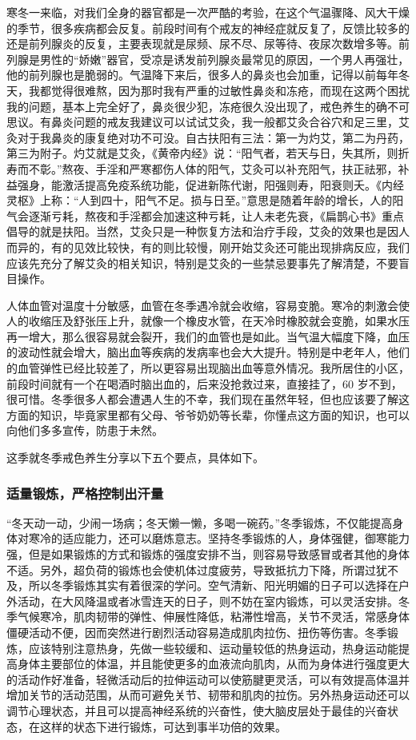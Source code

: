 寒冬一来临，对我们全身的器官都是一次严酷的考验，在这个气温骤降、风大干燥的季节，很多疾病都会反复。前段时间有个戒友的神经症就反复了，反馈比较多的还是前列腺炎的反复，主要表现就是尿频、尿不尽、尿等待、夜尿次数增多等。前列腺是男性的“娇嫩”器官，受凉是诱发前列腺炎最常见的原因，一个男人再强壮，他的前列腺也是脆弱的。气温降下来后，很多人的鼻炎也会加重，记得以前每年冬天，我都觉得很难熬，因为那时我有严重的过敏性鼻炎和冻疮，而现在这两个困扰我的问题，基本上完全好了，鼻炎很少犯，冻疮很久没出现了，戒色养生的确不可思议。有鼻炎问题的戒友我建议可以试试艾灸，我一般都艾灸合谷穴和足三里，艾灸对于我鼻炎的康复绝对功不可没。自古扶阳有三法：第一为灼艾，第二为丹药，第三为附子。灼艾就是艾灸，《黄帝内经》说：“阳气者，若天与日，失其所，则折寿而不彰。”熬夜、手淫和严寒都伤人体的阳气，艾灸可以补充阳气，扶正祛邪，补益强身，能激活提高免疫系统功能，促进新陈代谢，阳强则寿，阳衰则夭。《内经灵枢》上称：“人到四十，阳气不足。损与日至。”意思是随着年龄的增长，人的阳气会逐渐亏耗，熬夜和手淫都会加速这种亏耗，让人未老先衰，《扁鹊心书》重点倡导的就是扶阳。当然，艾灸只是一种恢复方法和治疗手段，艾灸的效果也是因人而异的，有的见效比较快，有的则比较慢，刚开始艾灸还可能出现排病反应，我们应该先充分了解艾灸的相关知识，特别是艾灸的一些禁忌要事先了解清楚，不要盲目操作。

人体血管对温度十分敏感，血管在冬季遇冷就会收缩，容易变脆。寒冷的刺激会使人的收缩压及舒张压上升，就像一个橡皮水管，在天冷时橡胶就会变脆，如果水压再一增大，那么很容易就会裂开，我们的血管也是如此。当气温大幅度下降，血压的波动性就会增大，脑出血等疾病的发病率也会大大提升。特别是中老年人，他们的血管弹性已经比较差了，所以更容易出现脑出血等意外情况。我所居住的小区，前段时间就有一个在喝酒时脑出血的，后来没抢救过来，直接挂了，60 岁不到，很可惜。冬季很多人都会遭遇人生的不幸，我们现在虽然年轻，但也应该要了解这方面的知识，毕竟家里都有父母、爷爷奶奶等长辈，你懂点这方面的知识，也可以向他们多多宣传，防患于未然。

这季就冬季戒色养生分享以下五个要点，具体如下。

\subsubsection{适量锻炼，严格控制出汗量}

“冬天动一动，少闹一场病；冬天懒一懒，多喝一碗药。”冬季锻炼，不仅能提高身体对寒冷的适应能力，还可以磨炼意志。坚持冬季锻炼的人，身体强健，御寒能力强，但是如果锻炼的方式和锻炼的强度安排不当，则容易导致感冒或者其他的身体不适。另外，超负荷的锻炼也会使机体过度疲劳，导致抵抗力下降，所谓过犹不及，所以冬季锻炼其实有着很深的学问。空气清新、阳光明媚的日子可以选择在户外活动，在大风降温或者冰雪连天的日子，则不妨在室内锻炼，可以灵活安排。冬季气候寒冷，肌肉韧带的弹性、伸展性降低，粘滞性增高，关节不灵活，常感身体僵硬活动不便，因而突然进行剧烈活动容易造成肌肉拉伤、扭伤等伤害。冬季锻炼，应该特别注意热身，先做一些较缓和、运动量较低的热身运动，热身运动能提高身体主要部位的体温，并且能使更多的血液流向肌肉，从而为身体进行强度更大的活动作好准备，轻微活动后的拉伸运动可以使筋腱更灵活，可以有效提高体温并增加关节的活动范围，从而可避免关节、韧带和肌肉的拉伤。另外热身运动还可以调节心理状态，并且可以提高神经系统的兴奋性，使大脑皮层处于最佳的兴奋状态，在这样的状态下进行锻炼，可达到事半功倍的效果。

